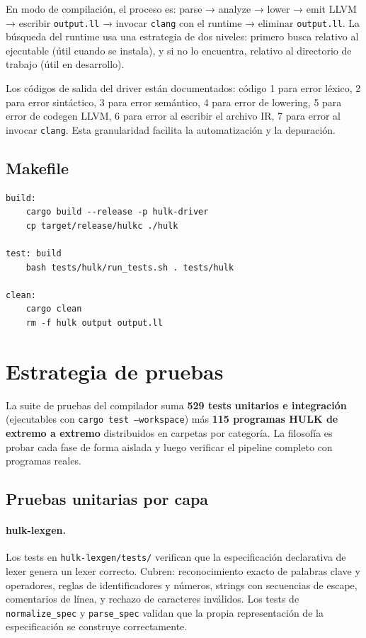 \documentclass[12pt,letterpaper]{article}
\newcommand{\hulk}{\textsc{HULK}}
\newcommand{\src}[1]{\texttt{#1}}
\begin{document}
En modo de compilación, el proceso es: parse → analyze → lower → emit LLVM → escribir \src{output.ll} → invocar \src{clang} con el runtime → eliminar \src{output.ll}. La búsqueda del runtime usa una estrategia de dos niveles: primero busca relativo al ejecutable (útil cuando se instala), y si no lo encuentra, relativo al directorio de trabajo (útil en desarrollo).

Los códigos de salida del driver están documentados: código 1 para error léxico, 2 para error sintáctico, 3 para error semántico, 4 para error de lowering, 5 para error de codegen LLVM, 6 para error al escribir el archivo IR, 7 para error al invocar \src{clang}. Esta granularidad facilita la automatización y la depuración.

\subsection{Makefile}

\begin{lstlisting}[caption={Objetivos del Makefile}]
build:
    cargo build --release -p hulk-driver
    cp target/release/hulkc ./hulk

test: build
    bash tests/hulk/run_tests.sh . tests/hulk

clean:
    cargo clean
    rm -f hulk output output.ll
\end{lstlisting}

\section{Estrategia de pruebas}

La suite de pruebas del compilador suma \textbf{529 tests unitarios e integración} (ejecutables con \src{cargo test --workspace}) más \textbf{115 programas \hulk{} de extremo a extremo} distribuidos en carpetas por categoría. La filosofía es probar cada fase de forma aislada y luego verificar el pipeline completo con programas reales.

\subsection{Pruebas unitarias por capa}

\paragraph{hulk-lexgen.}
Los tests en \src{hulk-lexgen/tests/} verifican que la especificación declarativa de lexer genera un lexer correcto. Cubren: reconocimiento exacto de palabras clave y operadores, reglas de identificadores y números, strings con secuencias de escape, comentarios de línea, y rechazo de caracteres inválidos. Los tests de \src{normalize\_spec} y \src{parse\_spec} validan que la propia representación de la especificación se construye correctamente.
\end{document}
